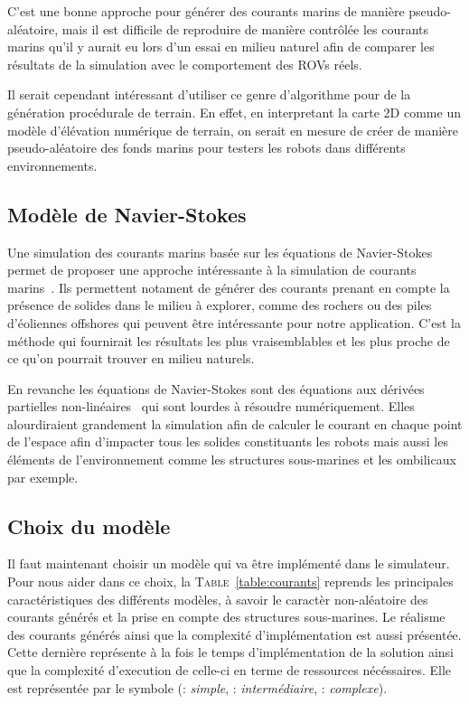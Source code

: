 			C'est une bonne approche pour générer des courants marins de manière pseudo-aléatoire, mais il est difficile de reproduire de manière contrôlée les courants marins qu'il y aurait eu lors d'un essai en milieu naturel afin de comparer les résultats de la simulation avec le comportement des \gls{ROV}s réels.
			
			Il serait cependant intéressant d'utiliser ce genre d'algorithme pour de la génération procédurale de terrain. En effet, en interpretant la carte 2D comme un modèle d'élévation numérique de terrain, on serait en mesure de créer de manière pseudo-aléatoire des fonds marins pour testers les robots dans différents environnements.

		\subsection{Modèle de Navier-Stokes}

			Une simulation des courants marins basée sur les équations de Navier-Stokes permet de proposer une approche intéressante à la simulation de courants marins~\cite{Garau2006current}. Ils permettent notament de générer des courants prenant en compte la présence de solides dans le milieu à explorer, comme des rochers ou des piles d'éoliennes offshores qui peuvent être intéressante pour notre application. C'est la méthode qui fournirait les résultats les plus vraisemblables et les plus proche de ce qu'on pourrait trouver en milieu naturels.

			En revanche les équations de Navier-Stokes sont des équations aux dérivées partielles non-linéaires~\cite{hinch2012hydrodynamique} qui sont lourdes à résoudre numériquement. Elles alourdiraient grandement la simulation afin de calculer le courant en chaque point de l'espace afin d'impacter tous les solides constituants les robots mais aussi les éléments de l'environnement comme les structures sous-marines et les ombilicaux par exemple.

		\subsection{Choix du modèle}

			Il faut maintenant choisir un modèle qui va être implémenté dans le simulateur. Pour nous aider dans ce choix, la \textsc{Table}~\ref{table:courants} reprends les principales caractéristiques des différents modèles, à savoir le caractèr non-aléatoire des courants générés et la prise en compte des structures sous-marines. Le réalisme des courants générés ainsi que la complexité d'implémentation est aussi présentée. Cette dernière représente à la fois le temps d'implémentation de la solution ainsi que la complexité d'execution de celle-ci en terme de ressources nécéssaires. Elle est représentée par le symbole \pmark (\pmark : \textit{simple}, \pmark \pmark : \textit{intermédiaire}, \pmark \pmark \pmark : \textit{complexe}).

